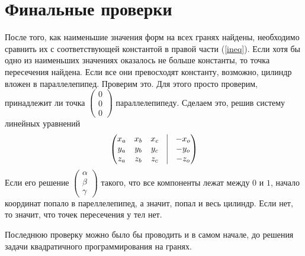 \documentclass[pdftex,ptm,12pt,a4paper]{report}
\begin{document}
\section{Финальные проверки}
  После того, как наименьшие значения форм на всех гранях найдены, необходимо сравнить их с соответствующей константой в правой части (\ref{ineq}). 
  Если хотя бы одно из наименьших значениях оказалось не больше константы, то точка пересечения найдена.
  Если все они превосходят константу, возможно, цилиндр вложен в параллелепипед.
  Проверим это.
  Для этого просто проверим, принадлежит ли точка $\begin{pmatrix}0 \\ 0 \\ 0 \end{pmatrix}$ параллелепипеду.
  Сделаем это, решив систему линейных уравнений 
  \[
    \begin{pmatrix}
     x_a & x_b & x_c & \vrule & -x_o\\
     y_a & y_b & y_c & \vrule & -y_o \\ 
     z_a & z_b & z_c & \vrule & -z_o
     \end{pmatrix}
  \]
  Если его решение $\begin{pmatrix} \alpha \\ \beta \\ \gamma \end{pmatrix}$ такого, что все компоненты лежат между $0$ и $1$, начало координат попало в пареллелепипед, а значит, попал и весь цилиндр. Если нет, то значит, что точек пересечения у тел нет.

  Последнюю проверку можно было бы проводить и в самом начале, до решения задачи квадратичного программирования на гранях.



\clearpage
\end{document}
